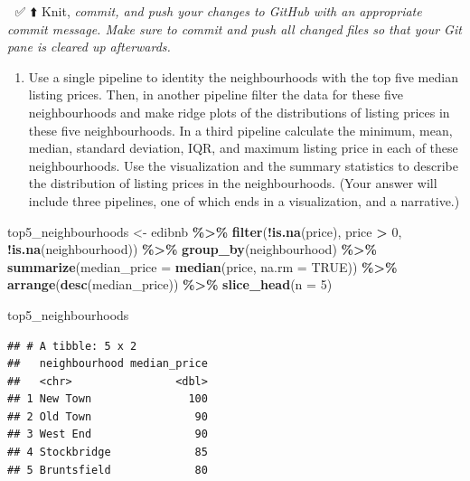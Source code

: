 \documentclass[
]{article}
\newenvironment{Shaded}{\begin{snugshade}}{\end{snugshade}}
\newcommand{\AttributeTok}[1]{\textcolor[rgb]{0.13,0.29,0.53}{#1}}
\newcommand{\ConstantTok}[1]{\textcolor[rgb]{0.56,0.35,0.01}{#1}}
\newcommand{\DecValTok}[1]{\textcolor[rgb]{0.00,0.00,0.81}{#1}}
\newcommand{\FunctionTok}[1]{\textcolor[rgb]{0.13,0.29,0.53}{\textbf{#1}}}
\newcommand{\NormalTok}[1]{#1}
\newcommand{\OtherTok}[1]{\textcolor[rgb]{0.56,0.35,0.01}{#1}}
\newcommand{\SpecialCharTok}[1]{\textcolor[rgb]{0.81,0.36,0.00}{\textbf{#1}}}
\providecommand{\tightlist}{%
  \setlength{\itemsep}{0pt}\setlength{\parskip}{0pt}}
\begin{document}
🧶 ✅ ⬆️ Knit, \emph{commit, and push your changes to GitHub with an
appropriate commit message. Make sure to commit and push all changed
files so that your Git pane is cleared up afterwards.}

\begin{enumerate}
\def\labelenumi{\arabic{enumi}.}
\setcounter{enumi}{3}
\tightlist
\item
  Use a single pipeline to identity the neighbourhoods with the top five
  median listing prices. Then, in another pipeline filter the data for
  these five neighbourhoods and make ridge plots of the distributions of
  listing prices in these five neighbourhoods. In a third pipeline
  calculate the minimum, mean, median, standard deviation, IQR, and
  maximum listing price in each of these neighbourhoods. Use the
  visualization and the summary statistics to describe the distribution
  of listing prices in the neighbourhoods. (Your answer will include
  three pipelines, one of which ends in a visualization, and a
  narrative.)
\end{enumerate}

\begin{Shaded}
\begin{Highlighting}[]
\NormalTok{top5\_neighbourhoods }\OtherTok{\textless{}{-}}\NormalTok{ edibnb }\SpecialCharTok{\%\textgreater{}\%}
  \FunctionTok{filter}\NormalTok{(}\SpecialCharTok{!}\FunctionTok{is.na}\NormalTok{(price), price }\SpecialCharTok{\textgreater{}} \DecValTok{0}\NormalTok{, }\SpecialCharTok{!}\FunctionTok{is.na}\NormalTok{(neighbourhood)) }\SpecialCharTok{\%\textgreater{}\%}
  \FunctionTok{group\_by}\NormalTok{(neighbourhood) }\SpecialCharTok{\%\textgreater{}\%}
  \FunctionTok{summarize}\NormalTok{(}\AttributeTok{median\_price =} \FunctionTok{median}\NormalTok{(price, }\AttributeTok{na.rm =} \ConstantTok{TRUE}\NormalTok{)) }\SpecialCharTok{\%\textgreater{}\%}
  \FunctionTok{arrange}\NormalTok{(}\FunctionTok{desc}\NormalTok{(median\_price)) }\SpecialCharTok{\%\textgreater{}\%}
  \FunctionTok{slice\_head}\NormalTok{(}\AttributeTok{n =} \DecValTok{5}\NormalTok{)}

\NormalTok{top5\_neighbourhoods}
\end{Highlighting}
\end{Shaded}

\begin{verbatim}
## # A tibble: 5 x 2
##   neighbourhood median_price
##   <chr>                <dbl>
## 1 New Town               100
## 2 Old Town                90
## 3 West End                90
## 4 Stockbridge             85
## 5 Bruntsfield             80
\end{verbatim}
\end{document}
